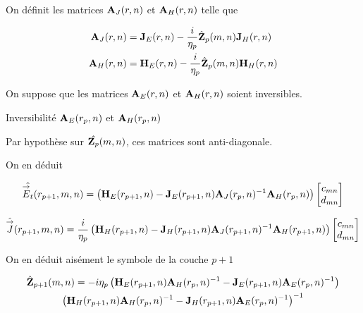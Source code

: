         On définit les matrices \(\mathbf{A}_{J}(r,n)\) et \(\mathbf{A}_{H}(r,n)\) telle que

        \begin{align}
            \mathbf{A}_{J}(r,n) &= \mathbf{J}_{E}(r,n) - \dfrac{i}{\eta_p}\hat{\mathbf{Z}}_p(m,n)\mathbf{J}_{H}(r,n)
            \\
            \mathbf{A}_{H}(r,n) &= \mathbf{H}_{E}(r,n) - \dfrac{i}{\eta_p}\hat{\mathbf{Z}}_p(m,n)\mathbf{H}_{H}(r,n)
        \end{align}

        On suppose que les matrices \(\mathbf{A}_{E}(r,n)\) et \(\mathbf{A}_{H}(r,n)\) soient inversibles.

        \begin{TODO}
          Inversibilité \(\mathbf{A}_{E}(r_p,n)\) et \(\mathbf{A}_{H}(r_p,n)\)
        \end{TODO}

        Par hypothèse sur \(\hat{\mathbf{Z}_p}(m,n)\), ces matrices sont anti-diagonale.

        On en déduit

        \begin{equation}
            \hat{{\overset{\rightarrow}{E}}_t}(r_{p+1},m,n) =
            \left(
                \mathbf{H}_{E}(r_{p+1},n)
                -
                \mathbf{J}_{E}(r_{p+1},n)
                \mathbf{A}_{J}(r_p,n)^{-1}
                \mathbf{A}_{H}(r_p,n)
            \right)
            \begin{bmatrix}
                c_{mn}
                \\
                d_{mn}
            \end{bmatrix}
        \end{equation}


        \begin{equation}
            \hat{{\overset{\rightarrow}{J}}}(r_{p+1},m,n) = \dfrac{i}{\eta_p}
            \left(
                \mathbf{H}_{H}(r_{p+1},n)
                -
                \mathbf{J}_{H}(r_{p+1},n)
                \mathbf{A}_{J}(r_{p+1},n)^{-1}
                \mathbf{A}_{H}(r_{p+1},n)
            \right)
            \begin{bmatrix}
                c_{mn}
                \\
                d_{mn}
            \end{bmatrix}
        \end{equation}

        On en déduit aisément le symbole de la couche \(p+1\)

        \begin{multline}
            \hat{\mathbf{Z}}_{p+1}(m,n) = -i\eta_p
            \left(
                \mathbf{H}_{E}(r_{p+1},n)
                \mathbf{A}_{H}(r_p,n)^{-1}
                -
                \mathbf{J}_{E}(r_{p+1},n)
                \mathbf{A}_{E}(r_p,n)^{-1}
            \right)
            \\
            \left(
                \mathbf{H}_{H}(r_{p+1},n)
                \mathbf{A}_{H}(r_p,n)^{-1}
                -
                \mathbf{J}_{H}(r_{p+1},n)
                \mathbf{A}_{E}(r_p,n)^{-1}
            \right)^{-1}
        \end{multline}

